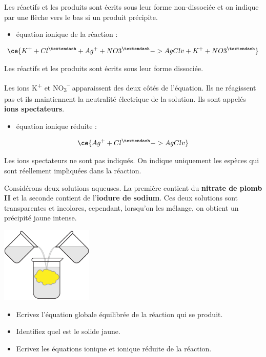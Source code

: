 \documentclass[
  11pt,
  a4paper,
  openany]{book}
\providecommand{\tightlist}{%
  \setlength{\itemsep}{0pt}\setlength{\parskip}{0pt}}
\begin{document}
Les réactifs et les produits sont écrits sous leur forme non-dissociée et on indique par une flèche vers le bas si un produit précipite.

\begin{itemize}
\tightlist
\item
  équation ionique de la réaction :
\end{itemize}

\[ \ce{K^{+} + Cl^{–} + Ag^{+} + NO3^{–} -> AgCl v + K^{+} + NO3^{–}} \]

Les réactifs et les produits sont écrits sous leur forme dissociée.

Les ions K\textsuperscript{+} et NO\textsubscript{3}\textsuperscript{--} apparaissent des deux côtés de l'équation. Ils ne réagissent pas et ils maintiennent la neutralité électrique de la solution. Ils sont appelés \textbf{ions spectateurs}.

\begin{itemize}
\tightlist
\item
  équation ionique réduite :
\end{itemize}

\[ \ce{Ag^{+} + Cl^{–} -> AgCl v} \]

Les ions spectateurs ne sont pas indiqués. On indique uniquement les espèces qui sont réellement impliquées dans la réaction.

\begin{Exercise}

Considérons deux solutions aqueuses. La première contient du \textbf{nitrate de plomb II} et la seconde contient de l'\textbf{iodure de sodium}. Ces deux solutions sont transparentes et incolores, cependant, lorsqu'on les mélange, on obtient un précipité jaune intense.

\includegraphics[width=0.33\textwidth,height=\textheight]{images/precipitation.png}

\begin{itemize}
\tightlist
\item
  Ecrivez l'équation globale équilibrée de la réaction qui se produit.
\item
  Identifiez quel est le solide jaune.
\item
  Ecrivez les équations ionique et ionique réduite de la réaction.
\end{itemize}


\end{Exercise}
\end{document}
